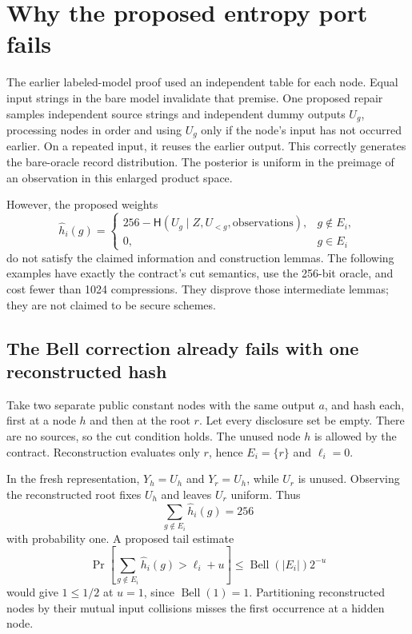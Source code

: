 \documentclass[10pt]{article}
\newcommand{\Ent}{\mathsf{H}}
\begin{document}
\appendix

\section{Why the proposed entropy port fails}\label{sec:obstructions}

The earlier labeled-model proof used an independent table for each node. Equal input strings in the bare model invalidate that premise. One proposed repair samples independent source strings and independent dummy outputs $U_g$, processing nodes in order and using $U_g$ only if the node's input has not occurred earlier. On a repeated input, it reuses the earlier output. This correctly generates the bare-oracle record distribution. The posterior is uniform in the preimage of an observation in this enlarged product space.

However, the proposed weights
\[
\widehat h_i(g)=
\begin{cases}
256-\Ent(U_g\mid Z,U_{<g},\text{observations}),&g\notin E_i,\\
0,&g\in E_i
\end{cases}
\]
do not satisfy the claimed information and construction lemmas. The following examples have exactly the contract's cut semantics, use the 256-bit oracle, and cost fewer than 1024 compressions. They disprove those intermediate lemmas; they are not claimed to be secure schemes.

\subsection{The Bell correction already fails with one reconstructed hash}

Take two separate public constant nodes with the same output $a$, and hash each, first at a node $h$ and then at the root $r$. Let every disclosure set be empty. There are no sources, so the cut condition holds. The unused node $h$ is allowed by the contract. Reconstruction evaluates only $r$, hence $E_i=\{r\}$ and $\ell_i=0$.

In the fresh representation, $Y_h=U_h$ and $Y_r=U_h$, while $U_r$ is unused. Observing the reconstructed root fixes $U_h$ and leaves $U_r$ uniform. Thus
\[
\sum_{g\notin E_i}\widehat h_i(g)=256
\]
with probability one. A proposed tail estimate
\[
\Pr\!\left[\sum_{g\notin E_i}\widehat h_i(g)>\ell_i+u\right]
\le\operatorname{Bell}(|E_i|)2^{-u}
\]
would give $1\le1/2$ at $u=1$, since $\operatorname{Bell}(1)=1$. Partitioning reconstructed nodes by their mutual input collisions misses the first occurrence at a hidden node.
\end{document}
